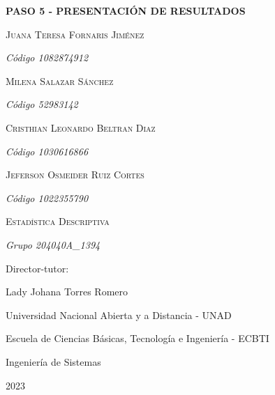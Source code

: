\begin{titlepage}
	\centering
	{\bfseries\LARGE PASO 5 - PRESENTACIÓN DE RESULTADOS\par}
	\vspace{2cm}
	{\scshape Juana Teresa Fornaris Jiménez \par}
	{\itshape C\'odigo 1082874912 \par}
	{\scshape Milena Salazar Sánchez \par}
	{\itshape C\'odigo 52983142 \par}
	{\scshape Cristhian Leonardo Beltran Diaz \par}
	{\itshape C\'odigo 1030616866  \par}
	{\scshape Jeferson Osmeider Ruiz Cortes \par}
	{\itshape C\'odigo 1022355790 \par}
	\vspace{1cm}
	{\scshape\Large Estadística Descriptiva \par}
	{\itshape\Large Grupo 204040A\_1394 \par}
	\vspace{1cm}
	{\Large Director-tutor: \par}
	{\Large Lady Johana Torres Romero \par}
	\vspace{1cm}
	{\Large Universidad Nacional Abierta y a Distancia - UNAD \par
	Escuela de Ciencias Básicas, Tecnología e Ingeniería - ECBTI\par
	Ingeniería de Sistemas\par}
	{\Large 2023 \par}
\end{titlepage}